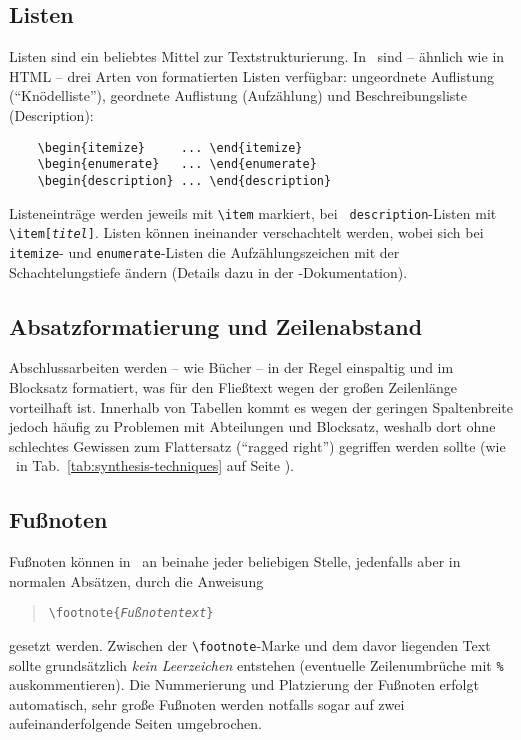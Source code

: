 \subsection{Listen}

Listen sind ein beliebtes Mittel zur Textstrukturierung. In
\latex\ sind -- ähnlich wie in HTML -- drei Arten von formatierten
Listen verfügbar: ungeordnete Auflistung ("`Knödelliste"'),
geordnete Auflistung (Aufzählung) und Beschreibungsliste
(Description):
%
\begin{verbatim}
    \begin{itemize}     ... \end{itemize}
    \begin{enumerate}   ... \end{enumerate}
    \begin{description} ... \end{description}
\end{verbatim}
%
Listeneinträge werden jeweils mit \verb!\item! markiert, bei {\tt
description}-Listen mit \verb!\item[!\texttt{\em titel}\verb!]!. Listen
können ineinander verschachtelt werden, wobei sich bei {\tt
itemize}- und \texttt{enumerate}-Listen die Aufzählungszeichen mit
der Schachtelungstiefe ändern (Details dazu in der
\latex-Dokumentation).


\subsection{Absatzformatierung und Zeilenabstand}

Abschlussarbeiten werden -- wie Bücher -- in der Regel einspaltig und
im Blocksatz formatiert, was für den Fließtext wegen der großen
Zeilenlänge vorteilhaft ist. Innerhalb von Tabellen kommt es
wegen der geringen Spaltenbreite jedoch häufig zu Problemen mit
Abteilungen und Blocksatz, weshalb dort ohne schlechtes
Gewissen zum Flattersatz ("`ragged right"') gegriffen werden sollte (wie
\zB\ in Tab.~\ref{tab:synthesis-techniques} auf Seite
\pageref{tab:synthesis-techniques}).


\subsection{Fußnoten}
Fußnoten können in \latex\ an beinahe jeder beliebigen Stelle,
jedenfalls aber in normalen Absätzen, durch die Anweisung
%
\begin{quote}
\verb!\footnote{!\texttt{\em Fußnotentext}\verb!}!
\end{quote}
%
gesetzt werden. Zwischen der \verb!\footnote!-Marke und dem davor
liegenden Text sollte grundsätzlich \emph{kein Leerzeichen} entstehen (eventuelle
Zeilen\-um\-brüche mit \verb!%! auskommentieren).
Die Nummerierung und Platzierung der Fußnoten
erfolgt automatisch, sehr große Fußnoten werden notfalls sogar auf
zwei aufeinanderfolgende Seiten umgebrochen.


